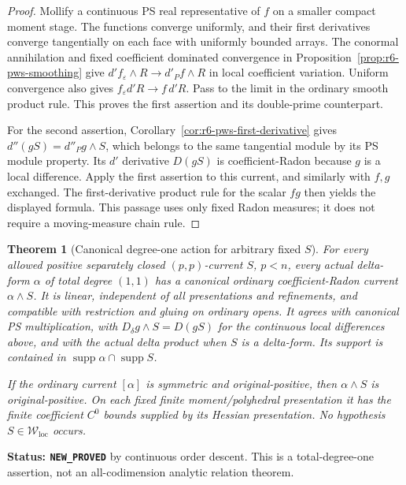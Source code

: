 \documentclass[11pt,a4paper]{article}
\numberwithin{equation}{section}
\newtheorem{theorem}{Theorem}[section]
\theoremstyle{definition}
\theoremstyle{remark}
\begin{document}
\begin{proof}
Mollify a continuous PS real representative of $f$ on a smaller
compact moment stage.  The functions converge uniformly, and their
first derivatives converge tangentially on each face with uniformly
bounded arrays.  The conormal annihilation and fixed coefficient
dominated convergence in Proposition~\ref{prop:r6-pws-smoothing}
give $d'f_\varepsilon\wedge R\to d'_Pf\wedge R$ in local coefficient
variation.  Uniform convergence also gives
$f_\varepsilon d'R\to f\,d'R$.  Pass to the limit in the ordinary
smooth product rule.  This proves the first assertion and its
double-prime counterpart.

For the second assertion, Corollary~\ref{cor:r6-pws-first-derivative}
gives $d''(gS)=d''_Pg\wedge S$, which belongs to the same tangential
module by its PS module property.  Its $d'$ derivative $D(gS)$ is
coefficient-Radon because $g$ is a local difference.  Apply the first
assertion to this current, and similarly with $f,g$ exchanged.
The first-derivative product rule for the scalar $fg$ then yields
the displayed formula.  This passage uses only fixed Radon measures;
it does not require a moving-measure chain rule.
\end{proof}

\begin{theorem}[Canonical degree-one action for arbitrary fixed $S$]
\label{thm:r6-arbitrary-background-degree-one-delta}
For every allowed positive separately closed $(p,p)$-current $S$,
$p<n$, every actual delta-form $\alpha$ of total degree $(1,1)$ has
a canonical ordinary coefficient-Radon current $\alpha\wedge S$.
It is linear, independent of all presentations and refinements,
and compatible with restriction and gluing on ordinary opens.
It agrees with canonical PS multiplication, with
$D_\delta g\wedge S=D(gS)$ for the continuous local differences
above, and with the actual delta product when $S$ is a delta-form.
Its support is contained in
$\operatorname{supp}\alpha\cap\operatorname{supp}S$.

If the ordinary current $[\alpha]$ is symmetric and original-positive,
then $\alpha\wedge S$ is original-positive.  On each fixed finite
moment/polyhedral presentation it has the finite coefficient $C^0$
bounds supplied by its Hessian presentation.
No hypothesis $S\in\mathcal W_{\mathrm{loc}}$ occurs.
\end{theorem}

\noindent\textbf{Status: \texttt{NEW\_PROVED}} by continuous
order descent.  This is a total-degree-one assertion, not an
all-codimension analytic relation theorem.
\end{document}
